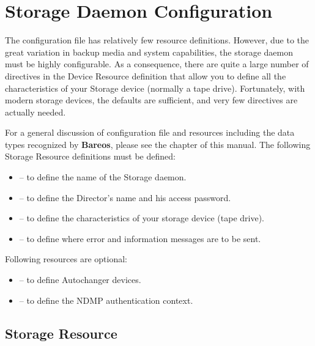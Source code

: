 
\chapter{Storage Daemon Configuration}
\label{StoredConfChapter}

The \bareosSd configuration file has relatively few resource definitions.
However, due to the great variation in backup media and system capabilities,
the storage daemon must be highly configurable. As a consequence, there are
quite a large number of directives in the Device Resource definition that
allow you to define all the characteristics of your Storage device (normally a
tape drive). Fortunately, with modern storage devices, the defaults are
sufficient, and very few directives are actually needed.

For a general discussion of configuration file and resources including the
data types recognized by {\bf Bareos}, please see the
 chapter of this manual. The
following Storage Resource definitions must be defined:

\begin{itemize}
\item
    -- to define the  name of the
   Storage daemon.
\item
    -- to  define the Director's
   name and his access password.
\item
    -- to define  the
   characteristics of your storage device (tape  drive).
\item
    -- to define where error  and
   information messages are to be sent.
\end{itemize}

Following resources are optional:
\begin{itemize}
\item
    -- to define Autochanger devices.
\item
    -- to define the NDMP authentication
   context.
\end{itemize}

\section{Storage Resource}
\label{StorageResourceStorage}

